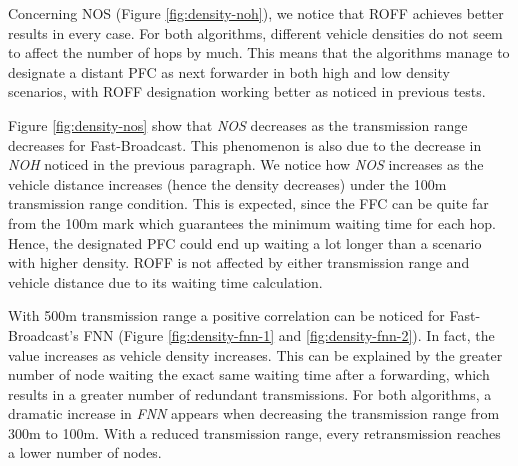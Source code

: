 		
		Concerning NOS (Figure \ref{fig:density-noh}), we notice that ROFF achieves better results in every case. For both algorithms, different vehicle densities do not seem to affect the number of hops by much. This means that the algorithms manage to designate a distant PFC as next forwarder in both high and low density scenarios, with ROFF designation working better as noticed in previous tests.
		
		
		Figure \ref{fig:density-nos} show that \textit{NOS} decreases as the transmission range decreases for Fast-Broadcast. This phenomenon is also due to the decrease in \textit{NOH} noticed in the previous paragraph. We notice how \textit{NOS} increases as the vehicle distance increases (hence the density decreases) under the 100m transmission range condition. This is expected, since the FFC can be quite far from the 100m mark which guarantees the minimum waiting time for each hop. Hence, the designated PFC could end up waiting a lot longer than a scenario with higher density.
		ROFF is not affected by either transmission range and vehicle distance due to its waiting time calculation.
		
		
		With 500m transmission range a positive correlation can be noticed for Fast-Broadcast's FNN (Figure \ref{fig:density-fnn-1} and \ref{fig:density-fnn-2}). In fact, the value increases as vehicle density increases. This can be explained by the greater number of node waiting the exact same waiting time after a forwarding, which results in a greater number of redundant transmissions. 
		For both algorithms, a dramatic increase in \textit{FNN} appears when decreasing the transmission range from 300m to 100m. With a reduced transmission range, every retransmission reaches a lower number of nodes.
		
	
